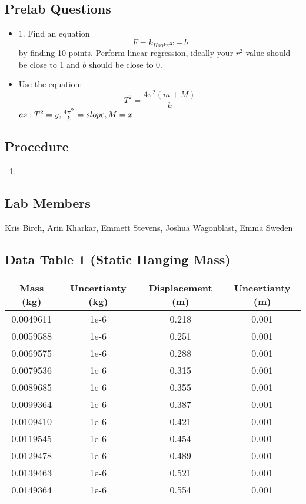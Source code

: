\documentclass[12pt]{article}
\begin{document}
\subsection{Prelab Questions}
\begin{itemize}
\item 1. Find an equation \begin{equation}
    F = k_{Hooke} x + b
\end{equation} by finding 10 points. Perform linear regression, ideally your $r^2$ value should be close to 1 and $b$ should be close to 0.
\item Use the equation: \begin{equation}
    T^2 = \frac{4\pi^2(m+M)}{k}
\end{equation}
\noindent \(as: \space T^2 = y, \frac{4\pi^2}{k} = slope, \space M=x\)
\end{itemize}
\subsection{Procedure}
\begin{enumerate}
    \item 
\end{enumerate}
\subsection{Lab Members}
Kris Birch, Arin Kharkar, Emmett Stevens, Joshua Wagonblast, Emma Sweden

\subsection{Data Table 1 (Static Hanging Mass)}
\begin{tabular}{|c|c|c|c|}
    \hline
    Mass (kg) & Uncertianty (kg) & Displacement (m) & Uncertianty (m) \\
    \hline
    0.0049611 & 1e-6         & 0.218 & 0.001 \\
    0.0059588 & 1e-6         & 0.251 & 0.001 \\
    0.0069575 & 1e-6         & 0.288 & 0.001 \\
    0.0079536 & 1e-6         & 0.315 & 0.001 \\
    0.0089685 & 1e-6         & 0.355 & 0.001 \\  
    0.0099364 & 1e-6         & 0.387 & 0.001 \\
    0.0109410 & 1e-6         & 0.421 & 0.001 \\
    0.0119545 & 1e-6         & 0.454 & 0.001 \\
    0.0129478 & 1e-6         & 0.489 & 0.001 \\
    0.0139463 & 1e-6         & 0.521 & 0.001 \\
    0.0149364 & 1e-6         & 0.554 & 0.001 \\
    \hline
  \end{tabular}
\end{document}
